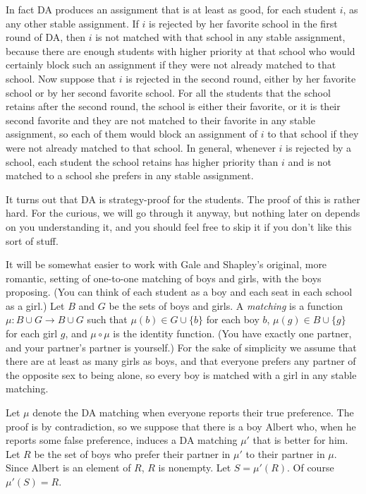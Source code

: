 \documentclass[12pt]{article}
\theoremstyle{definition}
\begin{document}
In fact DA produces an assignment that is at least as good, for each
student $i$, as any other stable assignment.  If $i$ is rejected by
her favorite school in the first round of DA, then $i$ is not matched
with that school in any stable assignment, because there are enough
students with higher priority at that school who would certainly block
such an assignment if they were not already matched to that school.
Now suppose that $i$ is rejected in the second round, either by her
favorite school or by her second favorite school.  For all the
students that the school retains after the second round, the school is
either their favorite, or it is their second favorite and they are not
matched to their favorite in any stable assignment, so each of them
would block an assignment of $i$ to that school if they were not
already matched to that school.  In general, whenever $i$ is rejected
by a school, each student the school retains has higher priority than
$i$ and is not matched to a school she prefers in any stable
assignment.

It turns out that DA is strategy-proof for the students.  The proof of
this is rather hard.  For the curious, we will go through it anyway,
but nothing later on depends on you understanding it, and you should
feel free to skip it if you don't like this sort of stuff.

It will be somewhat easier to work with Gale and Shapley's original,
more romantic, setting of one-to-one matching of boys and girls, with
the boys proposing.  (You can think of each student as a boy and each
seat in each school as a girl.)  Let $B$ and $G$ be the sets of boys
and girls.  A \emph{matching} is a function $\mu \colon B \cup G \to B
\cup G$ such that $\mu(b) \in G \cup \{b\}$ for each boy $b$, $\mu(g)
\in B \cup \{g\}$ for each girl $g$, and $\mu \circ \mu$ is the
identity function.  (You have exactly one partner, and your partner's
partner is yourself.)  For the sake of simplicity we assume that there
are at least as many girls as boys, and that everyone prefers any
partner of the opposite sex to being alone, so every boy is matched
with a girl in any stable matching.

Let $\mu$ denote the DA matching when everyone reports their true
preference.  The proof is by contradiction, so we suppose that there
is a boy Albert who, when he reports some false preference, induces a
DA matching $\mu'$ that is better for him.  Let $R$ be the set of boys
who prefer their partner in $\mu'$ to their partner in $\mu$.  Since
Albert is an element of $R$, $R$ is nonempty.  Let $S = \mu'(R)$.  Of
course $\mu'(S) = R$.
\end{document}
